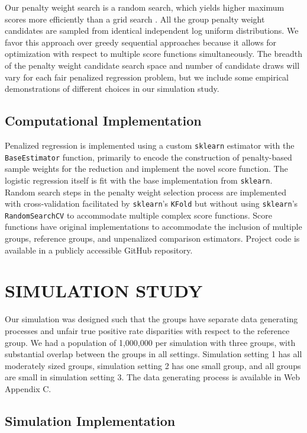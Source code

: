 \documentclass[
  12pt]{article}
\begin{document}
Our penalty weight search is a random search, which yields higher
maximum scores more efficiently than a grid search
\citep{bergstra_random_2012}. All the group penalty weight candidates
are sampled from identical independent log uniform distributions. We
favor this approach over greedy sequential approaches because it allows
for optimization with respect to multiple score functions
simultaneously. The breadth of the penalty weight candidate search space
and number of candidate draws will vary for each fair penalized
regression problem, but we include some empirical demonstrations of
different choices in our simulation study.

\subsection{Computational
Implementation}\label{computational-implementation}

Penalized regression is implemented using a custom \texttt{sklearn}
estimator with the \texttt{BaseEstimator} function, primarily to encode
the construction of penalty-based sample weights for the reduction and
implement the novel score function. The logistic regression itself is
fit with the base implementation from \texttt{sklearn}. Random search
steps in the penalty weight selection process are implemented with
cross-validation facilitated by \texttt{sklearn}'s \texttt{KFold} but
without using \texttt{sklearn}'s \texttt{RandomSearchCV} to accommodate
multiple complex score functions. Score functions have original
implementations to accommodate the inclusion of multiple groups,
reference groups, and unpenalized comparison estimators. Project code is
available in a publicly accessible GitHub repository.

\section{SIMULATION STUDY}\label{sec-sim}

Our simulation was designed such that the groups have separate data
generating processes and unfair true positive rate disparities with
respect to the reference group. We had a population of 1,000,000 per
simulation with three groups, with substantial overlap between the
groups in all settings. Simulation setting 1 has all moderately sized
groups, simulation setting 2 has one small group, and all groups are
small in simulation setting 3. The data generating process is available
in Web Appendix C.

\subsection{Simulation Implementation}\label{sec-simmethods}
\end{document}
